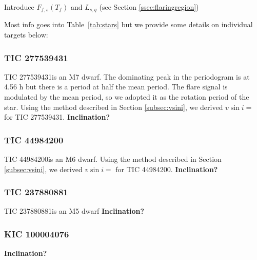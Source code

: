\documentclass[fleqn,usenatbib,letters]{mnras}%
\newcommand{\FA}{TIC 277539431} %
\newcommand{\FB}{TIC 44984200} %
\newcommand{\FC}{TIC 237880881} %
\newcommand{\FE}{KIC 100004076} %
\begin{document}
Introduce $F_{f,s}(T_f)$ and $L_{s,q}$ (see Section \ref{ssec:flaringregion})

Most info goes into Table~\ref{tab:stars} but we provide some details on individual targets below:

\subsubsection{\FA}
\label{sec:propsA}
\FA is an M7 dwarf. The dominating peak in the periodogram is at 4.56 h but there is a period at half the mean period. The flare signal is modulated by the mean period, so we adopted it as the rotation period of the star.
Using the method described in Section \ref{subsec:vsini}, we derived $v\sin i=$ for \FA. \textbf{Inclination?}
\subsubsection{\FB}
\label{sec:propsB}
\FB is an M6 dwarf. Using the method described in Section \ref{subsec:vsini}, we derived $v\sin i=$ for \FB.
\textbf{Inclination?}
\subsubsection{\FC}
\label{sec:propsC}
\FC is an M5 dwarf 
\textbf{Inclination?}
\subsubsection{\FE}
\label{sec:propsE}

\textbf{Inclination?}
\end{document}
